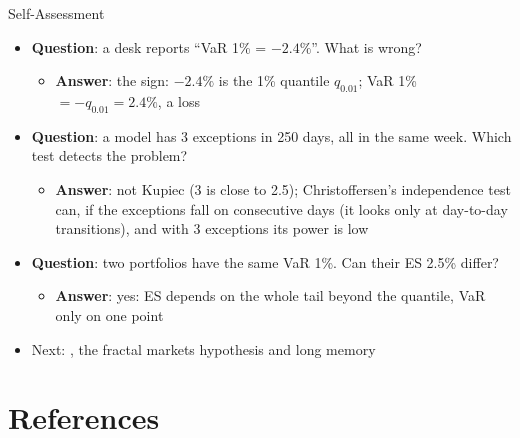 \begin{frame}{Self-Assessment}
\itemsize{\small}
\begin{itemize}
    \item \textbf{Question}: a desk reports ``VaR 1\% = $-2.4\%$''. What is wrong?
    \begin{itemize}
        \item \textbf{Answer}: the sign: $-2.4\%$ is the 1\% quantile $q_{0.01}$; VaR 1\% $= -q_{0.01} = 2.4\%$, a loss
    \end{itemize}
    \item \textbf{Question}: a model has 3 exceptions in 250 days, all in the same week. Which test detects the problem?
    \begin{itemize}
        \item \textbf{Answer}: not Kupiec (3 is close to 2.5); Christoffersen's independence test can, if the exceptions fall on consecutive days (it looks only at day-to-day transitions), and with 3 exceptions its power is low
    \end{itemize}
    \item \textbf{Question}: two portfolios have the same VaR 1\%. Can their ES 2.5\% differ?
    \begin{itemize}
        \item \textbf{Answer}: yes: ES depends on the whole tail beyond the quantile, VaR only on one point
    \end{itemize}
    \item Next: , the fractal markets hypothesis and long memory
\end{itemize}
\end{frame}


\section{References}

